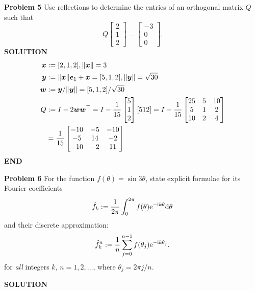 \documentclass[12pt,a4paper]{article}
\def\x{ {\vc x} }
\def\e{ {\vc e} }
\def\y{ {\vc y} }
\def\w{ {\vc w} }
\begin{document}
\textbf{Problem 5} Use reflections to determine the entries of an orthogonal matrix $Q$ such that
\[
Q \begin{bmatrix} 2 \\ 1 \\ 2 \end{bmatrix} =  \begin{bmatrix} -3 \\ 0 \\ 0 \end{bmatrix}.
\]
\textbf{SOLUTION}
\begin{align*}
\ensuremath{\bm{\x}} &:= [2,1,2], \| \ensuremath{\bm{\x}} \| = 3\\
\ensuremath{\bm{\y}} &:= \|\ensuremath{\bm{\x}}\| \ensuremath{\bm{\e}}_1 + \ensuremath{\bm{\x}} = [5,1,2], \| \ensuremath{\bm{\y}} \| = \sqrt{30} \\
\ensuremath{\bm{\w}} &:= \ensuremath{\bm{\y}} / \| \ensuremath{\bm{\y}} \| = [5,1,2] /  \sqrt{30} \\
Q &:= I - 2\ensuremath{\bm{\w}} \ensuremath{\bm{\w}}^\ensuremath{\top} = I - {1 \over 15} \begin{bmatrix}5 \\ 1 \\ 2 \end{bmatrix} [5 1 2] = I - {1 \over 15} \begin{bmatrix} 25 & 5 & 10 \\5 & 1 & 2 \\ 10 & 2 & 4 \end{bmatrix} \\
&= {1 \over 15} \begin{bmatrix} -10 & -5 & -10 \\ -5 & 14 & -2 \\ -10 & -2 & 11 \end{bmatrix}
\end{align*}
\textbf{END}

\textbf{Problem 6} For the function $f(\ensuremath{\theta}) = \sin 3 \ensuremath{\theta}$, state explicit formulae for its Fourier coefficients
\[
\hat f_k := {1 \over 2\ensuremath{\pi}} \int_0^{2\ensuremath{\pi}} f(\ensuremath{\theta}) {\rm e}^{-{\rm i} k \ensuremath{\theta}} {\rm d}\ensuremath{\theta}
\]
and  their discrete approximation:
\[
\hat f_k^n := {1 \over n} \sum_{j=0}^{n-1} f(\ensuremath{\theta}_j) {\rm e}^{-{\rm i} k \ensuremath{\theta}_j}.
\]
for \emph{all} integers $k$, $n = 1,2,\ensuremath{\ldots}$, where $\ensuremath{\theta}_j = 2\ensuremath{\pi} j/n$.

\textbf{SOLUTION}
\end{document}
